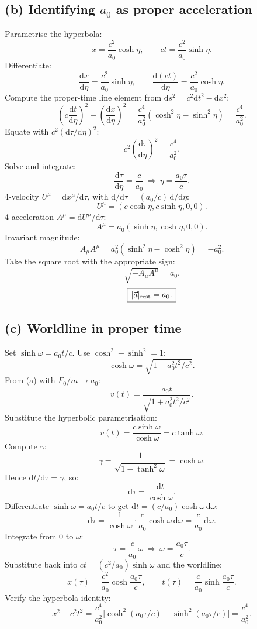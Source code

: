 \documentclass[11pt]{article}
\newcommand{\de}{\mathrm{d}}
\begin{document}
\subsection*{(b) Identifying $a_0$ as proper acceleration}

Parametrise the hyperbola:
\[ x=\frac{c^2}{a_0}\cosh\eta,\qquad ct=\frac{c^2}{a_0}\sinh\eta. \]
Differentiate:
\[ \frac{\de x}{\de\eta}=\frac{c^2}{a_0}\sinh\eta,\qquad\frac{\de(ct)}{\de\eta}=\frac{c^2}{a_0}\cosh\eta. \]
Compute the proper-time line element from $\de s^2=c^2\de t^2-\de x^2$:
\[ \left(c\frac{\de t}{\de\eta}\right)^{\!2}-\left(\frac{\de x}{\de\eta}\right)^{\!2}=\frac{c^4}{a_0^2}(\cosh^2\eta-\sinh^2\eta)=\frac{c^4}{a_0^2}. \]
Equate with $c^2(\de\tau/\de\eta)^2$:
\[ c^2\left(\frac{\de\tau}{\de\eta}\right)^{\!2}=\frac{c^4}{a_0^2}. \]
Solve and integrate:
\[ \frac{\de\tau}{\de\eta}=\frac{c}{a_0}\ \Rightarrow\ \eta=\frac{a_0\tau}{c}. \]
4-velocity $U^\mu=\de x^\mu/\de\tau$, with $\de/\de\tau=(a_0/c)\,\de/\de\eta$:
\[ U^\mu=(c\cosh\eta,c\sinh\eta,0,0). \]
4-acceleration $A^\mu=\de U^\mu/\de\tau$:
\[ A^\mu=a_0(\sinh\eta,\cosh\eta,0,0). \]
Invariant magnitude:
\[ A_\mu A^\mu=a_0^2(\sinh^2\eta-\cosh^2\eta)=-a_0^2. \]
Take the square root with the appropriate sign:
\[ \sqrt{-A_\mu A^\mu}=a_0. \]
\begin{equation}
\boxed{\,|\vec a|_{\rm rest}=a_0.\,}
\end{equation}

\subsection*{(c) Worldline in proper time}

Set $\sinh\omega=a_0t/c$. Use $\cosh^2-\sinh^2=1$:
\[ \cosh\omega=\sqrt{1+a_0^2t^2/c^2}. \]
From (a) with $F_0/m\to a_0$:
\[ v(t)=\frac{a_0t}{\sqrt{1+a_0^2t^2/c^2}}. \]
Substitute the hyperbolic parametrisation:
\[ v(t)=\frac{c\sinh\omega}{\cosh\omega}=c\tanh\omega. \]
Compute $\gamma$:
\[ \gamma=\frac{1}{\sqrt{1-\tanh^2\omega}}=\cosh\omega. \]
Hence $\de t/\de\tau=\gamma$, so:
\[ \de\tau=\frac{\de t}{\cosh\omega}. \]
Differentiate $\sinh\omega=a_0t/c$ to get $\de t=(c/a_0)\cosh\omega\,\de\omega$:
\[ \de\tau=\frac{1}{\cosh\omega}\cdot\frac{c}{a_0}\cosh\omega\,\de\omega=\frac{c}{a_0}\,\de\omega. \]
Integrate from $0$ to $\omega$:
\[ \tau=\frac{c}{a_0}\,\omega\ \Rightarrow\ \omega=\frac{a_0\tau}{c}. \]
Substitute back into $ct=(c^2/a_0)\sinh\omega$ and the worldline:
\begin{equation}
\boxed{\,x(\tau)=\frac{c^2}{a_0}\cosh\!\frac{a_0\tau}{c},\qquad t(\tau)=\frac{c}{a_0}\sinh\!\frac{a_0\tau}{c}.\,}
\end{equation}
Verify the hyperbola identity:
\[ x^2-c^2t^2=\frac{c^4}{a_0^2}\bigl[\cosh^2(a_0\tau/c)-\sinh^2(a_0\tau/c)\bigr]=\frac{c^4}{a_0^2}. \]
\end{document}
